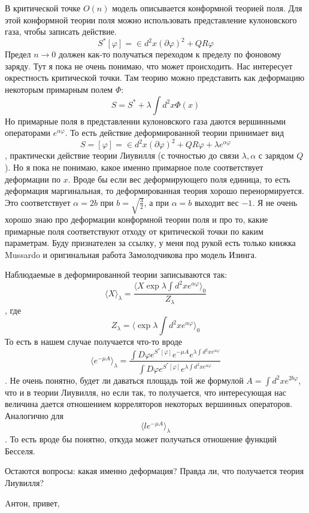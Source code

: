 \documentclass[12pt]{article}
\begin{document}
В критической точке $O(n)$ модель описывается конформной теорией поля.
Для этой конформной теории поля можно использовать представление
кулоновского газа, чтобы записать действие. 
$$S^{*} [\varphi] = \in d^2 x (\partial \varphi)^2 + QR \varphi$$
Предел $n\to 0$ должен как-то получаться переходом к пределу по фоновому
заряду. Тут я пока не очень понимаю, что может происходить.
Нас интересует окрестность критической точки. Там теорию можно
представить как деформацию некоторым примарным полем $\Phi$:
$$S=S^{*} + \lambda \int d^2 x \Phi(x)$$
Но примарные поля в представлении кулоновского газа даются вершинными
операторами $e^{\alpha \varphi}$. То есть действие деформированной
теории принимает вид 
$$S=[\varphi] = \in d^2 x (\partial \varphi)^2 + QR \varphi+\lambda
e^{\alpha \varphi}$$,
практически действие теории Лиувилля (с точностью до связи $\lambda,
\alpha$ с зарядом $Q$). Но я пока не понимаю, какое именно примарное
поле соответствует деформации по $x$. Вроде бы если вес деформирующего
поля единица, то есть деформация маргинальная, то деформированная теория
хорошо перенормируется. Это соответствует $\alpha=2b$ при
$b=\sqrt{\frac{3}{2}}$, а при $\alpha=b$ выходит вес $-1$. Я не очень
хорошо знаю про деформации конформной теории поля и про то, какие
примарные поля соответствуют отходу от критической точки по каким
параметрам. Буду признателен за ссылку, у меня под рукой есть только
книжка Mussardo и оригинальная работа Замолодчикова про модель Изинга. 

Наблюдаемые в деформированной теории записываются так:
$$\langle X \rangle_{\lambda} = \frac{\langle X \exp{\lambda \int d^2 x
e^{\alpha \varphi}}\rangle_0}{Z_{\lambda}}$$,
где 
$$Z_{\lambda}=\langle \exp{\lambda \int d^2 x e^{\alpha
\varphi}}\rangle_0$$
То есть в нашем случае получается что-то вроде 
$$\langle e^{-\mu A}\rangle_{\lambda} = \frac{\int D\varphi
e^{S^{*}[\varphi]} e^{-\mu A} e^{\lambda \int d^2 x e^{\alpha
\varphi}}}{\int D\varphi e^{S^{*}[\varphi]} e^{\lambda \int d^2 x
e^{\alpha \varphi}}}$$.
Не очень понятно, будет ли даваться площадь той же формулой $A=\int d^2
x e^{2b\varphi}$, что и в теории Лиувилля, но если так, то получается,
что интересующая нас величина дается отношением корреляторов некоторых
вершинных операторов. 
Аналогично для $$\langle l e^{-\mu A}\rangle_{\lambda}$$. 
То есть вроде бы понятно, откуда может получаться отношение функций Бесселя. 

Остаются вопросы: какая именно деформация?
Правда ли, что получается теория Лиувилля?


\newpage
Aнтон, привет,
\end{document}
